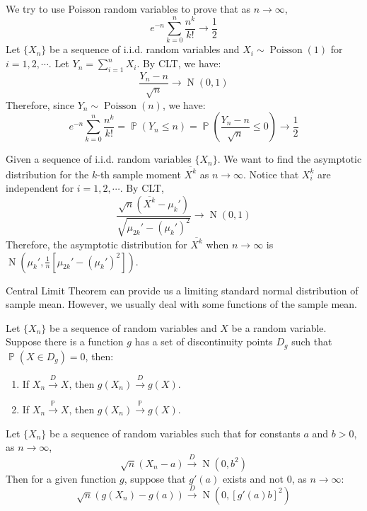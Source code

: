 \documentclass{huhtakm-template-book-v2}
\DeclareMathOperator{\prob}{\mathbb{P}}
\DeclareMathOperator{\Poisson}{Poisson}
\DeclareMathOperator{\N}{N}
\begin{document}
\newpage
\begin{eg}
	We try to use Poisson random variables to prove that as $n\to\infty$,
	\begin{equation*}
		e^{-n}\sum_{k=0}^{n}\frac{n^{k}}{k!}\to\frac{1}{2}
	\end{equation*}
	Let $\{X_{n}\}$ be a sequence of i.i.d. random variables and $X_{i}\sim\Poisson(1)$ for $i=1,2,\cdots$. Let $Y_{n}=\sum_{i=1}^{n}X_{i}$. By CLT, we have:
	\begin{equation*}
		\frac{Y_{n}-n}{\sqrt{n}}\to\N(0,1)
	\end{equation*}
	Therefore, since $Y_{n}\sim\Poisson(n)$, we have:
	\begin{equation*}
		e^{-n}\sum_{k=0}^{n}\frac{n^{k}}{k!}=\prob(Y_{n}\leq n)=\prob\left(\frac{Y_{n}-n}{\sqrt{n}}\leq 0\right)\to\frac{1}{2}
	\end{equation*}
\end{eg}
\begin{eg}
	Given a sequence of i.i.d. random variables $\{X_{n}\}$. We want to find the asymptotic distribution for the $k$-th sample moment $\overline{X^{k}}$ as $n\to\infty$. Notice that $X_{i}^{k}$ are independent for $i=1,2,\cdots$. By CLT,
	\begin{equation*}
		\frac{\sqrt{n}(\overline{X^{k}}-\mu_{k}')}{\sqrt{\mu_{2k}'-(\mu_{k}')^{2}}}\to\N(0,1)
	\end{equation*}
	Therefore, the asymptotic distribution for $\overline{X^{k}}$ when $n\to\infty$ is $\N(\mu_{k}',\frac{1}{n}[\mu_{2k}'-(\mu_{k}')^{2}])$.
\end{eg}
Central Limit Theorem can provide us a limiting standard normal distribution of sample mean. However, we usually deal with some functions of the sample mean.
\begin{thm}
	Let $\{X_{n}\}$ be a sequence of random variables and $X$ be a random variable. Suppose there is a function $g$ has a set of discontinuity points $D_{g}$ such that $\prob(X\in D_{g})=0$, then:
	\begin{enumerate}
		\item If $X_{n}\xrightarrow{D}X$, then $g(X_{n})\xrightarrow{D}g(X)$.
		\item If $X_{n}\xrightarrow{\prob}X$, then $g(X_{n})\xrightarrow{\prob}g(X)$.
	\end{enumerate}
\end{thm}
\begin{thm}
	Let $\{X_{n}\}$ be a sequence of random variables such that for constants $a$ and $b>0$, as $n\to\infty$,
	\begin{equation*}
		\sqrt{n}(X_{n}-a)\xrightarrow{D}\N(0,b^{2})
	\end{equation*}
	Then for a given function $g$, suppose that $g'(a)$ exists and not $0$, as $n\to\infty$:
	\begin{equation*}
		\sqrt{n}(g(X_{n})-g(a))\xrightarrow{D}\N(0,[g'(a)b]^{2})
	\end{equation*}
\end{thm}
\end{document}
